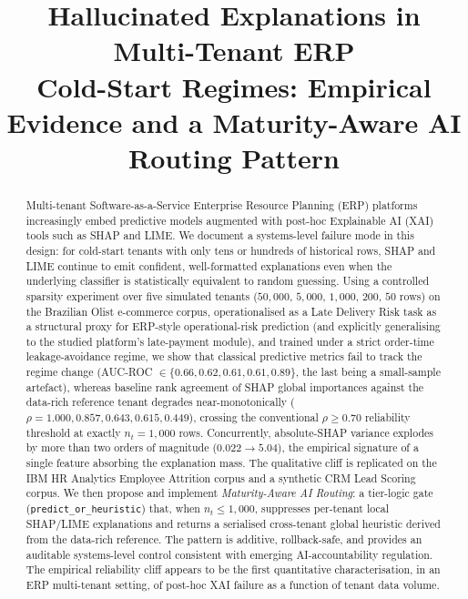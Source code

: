 \documentclass[conference]{IEEEtran}
\newcommand{\auc}{AUC\nobreakdash-ROC}
\newcommand{\nT}{n_t}
\begin{document}
\title{Hallucinated Explanations in Multi-Tenant ERP\\Cold-Start Regimes:
       Empirical Evidence and a Maturity-Aware AI Routing Pattern}

\author{%
}

\maketitle

\begin{abstract}
Multi-tenant Software-as-a-Service Enterprise Resource Planning (ERP)
platforms increasingly embed predictive models augmented with post-hoc
Explainable AI (XAI) tools such as SHAP and LIME. We document a
systems-level failure mode in this design: for cold-start tenants with
only tens or hundreds of historical rows, SHAP and LIME continue to emit
confident, well-formatted explanations even when the underlying classifier
is statistically equivalent to random guessing. Using a controlled
sparsity experiment over five simulated tenants ($50{,}000$, $5{,}000$,
$1{,}000$, $200$, $50$ rows) on the Brazilian Olist e-commerce corpus,
operationalised as a Late Delivery Risk task as a structural proxy for
ERP-style operational-risk prediction (and explicitly generalising to the
studied platform's late-payment module), and trained under a strict
order-time leakage-avoidance regime, we show that classical predictive
metrics fail to track the regime change (\auc{} $\in\{0.66, 0.62, 0.61,
0.61, 0.89\}$, the last being a small-sample artefact), whereas
baseline rank agreement of SHAP global importances against the data-rich
reference tenant degrades near-monotonically ($\rho = 1.000, 0.857,
0.643, 0.615, 0.449$), crossing the conventional $\rho \ge 0.70$
reliability threshold at exactly $\nT = 1{,}000$ rows. Concurrently,
absolute-SHAP variance explodes by more than two orders of magnitude
($0.022 \to 5.04$), the empirical signature of a single feature absorbing
the explanation mass. The qualitative cliff is replicated on the IBM HR
Analytics Employee Attrition corpus and a synthetic CRM Lead Scoring
corpus. We then propose and implement \emph{Maturity-Aware AI Routing}: a
tier-logic gate (\texttt{predict\_or\_heuristic}) that, when
$\nT \le 1{,}000$, suppresses per-tenant local SHAP/LIME explanations and
returns a serialised cross-tenant global heuristic derived from the
data-rich reference. The pattern is additive, rollback-safe, and provides
an auditable systems-level control consistent with emerging
AI-accountability regulation. The empirical reliability cliff appears to be
the first quantitative characterisation, in an ERP multi-tenant setting,
of post-hoc XAI failure as a function of tenant data volume.
\end{abstract}
\end{document}
